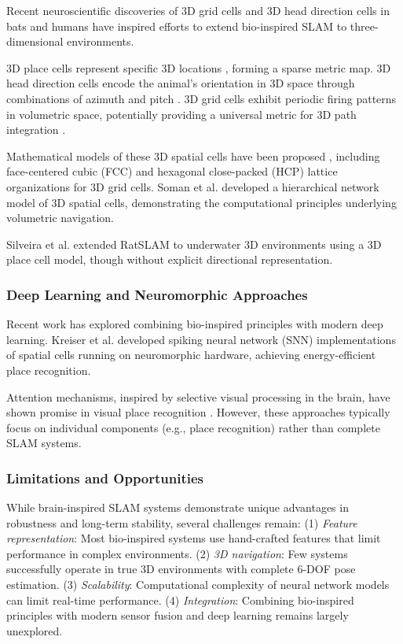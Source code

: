 Recent neuroscientific discoveries of 3D grid cells and 3D head direction cells in bats \cite{Finkelstein2015, Finkelstein2016} and humans \cite{Kim2017, Kim2018a, Kim2018b, Kim2019} have inspired efforts to extend bio-inspired SLAM to three-dimensional environments.

3D place cells represent specific 3D locations \cite{Yartsev2013, Wohlgemuth2018}, forming a sparse metric map.
3D head direction cells encode the animal's orientation in 3D space through combinations of azimuth and pitch \cite{Finkelstein2015, Page2018, Shinder2019}.
3D grid cells exhibit periodic firing patterns in volumetric space, potentially providing a universal metric for 3D path integration \cite{Finkelstein2016, Casali2019}.

Mathematical models of these 3D spatial cells have been proposed \cite{Jeffery2013, Jeffery2015}, including face-centered cubic (FCC) and hexagonal close-packed (HCP) lattice organizations for 3D grid cells.
Soman et al. \cite{Soman2018} developed a hierarchical network model of 3D spatial cells, demonstrating the computational principles underlying volumetric navigation.

Silveira et al. \cite{Silveira2013, Silveira2015} extended RatSLAM to underwater 3D environments using a 3D place cell model, though without explicit directional representation.

\subsubsection{Deep Learning and Neuromorphic Approaches}

Recent work has explored combining bio-inspired principles with modern deep learning.
Kreiser et al. \cite{Kreiser2018a, Kreiser2018b} developed spiking neural network (SNN) implementations of spatial cells running on neuromorphic hardware, achieving energy-efficient place recognition.

Attention mechanisms, inspired by selective visual processing in the brain, have shown promise in visual place recognition \cite{Chen2017}.
However, these approaches typically focus on individual components (e.g., place recognition) rather than complete SLAM systems.

\subsubsection{Limitations and Opportunities}

While brain-inspired SLAM systems demonstrate unique advantages in robustness and long-term stability, several challenges remain:
(1) \textit{Feature representation}: Most bio-inspired systems use hand-crafted features that limit performance in complex environments.
(2) \textit{3D navigation}: Few systems successfully operate in true 3D environments with complete 6-DOF pose estimation.
(3) \textit{Scalability}: Computational complexity of neural network models can limit real-time performance.
(4) \textit{Integration}: Combining bio-inspired principles with modern sensor fusion and deep learning remains largely unexplored.

